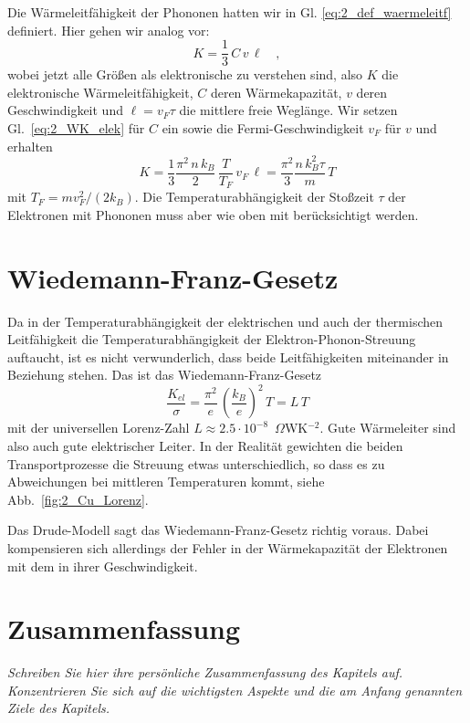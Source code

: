 Die  Wärmeleitfähigkeit der Phononen hatten wir in Gl. \ref{eq:2_def_waermeleitf} definiert. Hier gehen wir analog vor:
\begin{equation}
   K  = \frac{1}{3} \, C \, v \, \ell \quad , 
\end{equation}
wobei jetzt alle Größen als elektronische zu verstehen sind, also $K$ die elektronische Wärmeleitfähigkeit, $C$ deren Wärmekapazität, $v$ deren Geschwindigkeit und $\ell =  v_F \tau$ die mittlere freie Weglänge. Wir setzen Gl.~\ref{eq:2_WK_elek} für $C$ ein sowie die Fermi-Geschwindigkeit $v_F$ für $v$  und erhalten
\begin{equation}
   K  =  \frac{1}{3} \frac{\pi^2 \, n \, k_B}{2}  \, \frac{T}{T_F}  \, v_F \, \ell
   =     \frac{\pi^2 }{3} \frac{ n \, k_B^2 \tau}{m}  \, T 
\end{equation}
mit $T_F = m v_F^2 / (2 k_B)$. Die Temperaturabhängigkeit der Stoßzeit $\tau$ der Elektronen mit Phononen muss aber wie oben mit berücksichtigt werden. 


\section{Wiedemann-Franz-Gesetz}

Da in der Temperaturabhängigkeit der elektrischen und auch der thermischen Leitfähigkeit die Temperaturabhängigkeit der Elektron-Phonon-Streuung auftaucht, ist es nicht verwunderlich, dass beide Leitfähigkeiten miteinander in Beziehung stehen. Das ist das Wiedemann-Franz-Gesetz
\begin{equation}
   \frac{K_{el}}{\sigma} = \frac{\pi^2}{e} \, \left( \frac{k_B}{e} \right)^2 \, T = L \, T
\end{equation}
mit der universellen Lorenz-Zahl $L \approx 2.5 \cdot 10^{-8}$~$\Omega$WK$^{-2}$. Gute Wärmeleiter sind also auch gute elektrischer Leiter. In der Realität gewichten die beiden Transportprozesse die Streuung etwas unterschiedlich, so dass es zu Abweichungen bei mittleren Temperaturen kommt, siehe Abb.~\ref{fig:2_Cu_Lorenz}.

Das Drude-Modell sagt das Wiedemann-Franz-Gesetz richtig voraus. Dabei kompensieren sich allerdings der Fehler in der Wärmekapazität der Elektronen mit dem in ihrer Geschwindigkeit.



\newpage
\section{Zusammenfassung}

\textit{Schreiben Sie hier ihre persönliche Zusammenfassung des Kapitels auf. Konzentrieren Sie sich auf die wichtigsten Aspekte und die am Anfang genannten Ziele des Kapitels.}

 \vspace*{10cm}

\printbibliography[segment=\therefsegment,heading=subbibliography]
